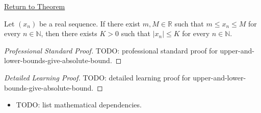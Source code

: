 \newpage
{}
\label{prf:upper-and-lower-bounds-give-absolute-bound}

\begin{remark*}[Return]
\hyperref[thm:upper-and-lower-bounds-give-absolute-bound]{Return to Theorem}
\end{remark*}

\begin{theorem*}
Let $(x_n)$ be a real sequence. If there exist $m,M \in \mathbb{R}$ such
that $m \le x_n \le M$ for every $n \in \mathbb{N}$, then there exists
$K > 0$ such that $|x_n| \le K$ for every $n \in \mathbb{N}$.

\smallskip
\noindent
\end{theorem*}

\begin{proof}[Professional Standard Proof]
\LRAProofBodyStart
TODO: professional standard proof for upper-and-lower-bounds-give-absolute-bound.
\end{proof}

\begin{proof}[Detailed Learning Proof]
\LRAProofBodyStart
TODO: detailed learning proof for upper-and-lower-bounds-give-absolute-bound.
\end{proof}

\begin{remark*}
\end{remark*}

\begin{dependencies}
\begin{itemize}
  \item TODO: list mathematical dependencies.
\end{itemize}
\end{dependencies}

\clearpage
